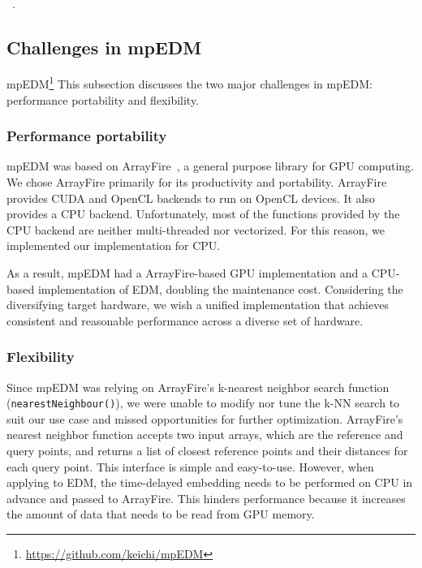 \documentclass[conference]{IEEEtran}
\begin{document}
~\cite{Natsukawa2017,VanBerkel2020}

~\cite{Pu2019,Ma2017}.

\subsection{Challenges in mpEDM}\label{sec:challenges}

mpEDM\footnote{\url{https://github.com/keichi/mpEDM}}
This subsection discusses the two major challenges in mpEDM: performance
portability and flexibility.

\subsubsection{Performance portability}

mpEDM was based on ArrayFire~\cite{Malcolm2012}, a general purpose library for
GPU computing. We chose ArrayFire primarily for its productivity and
portability. ArrayFire provides CUDA and OpenCL backends to run on OpenCL
devices. It also provides a CPU backend. Unfortunately, most of the functions
provided by the CPU backend are neither multi-threaded nor vectorized. For this
reason, we implemented our implementation for CPU\@.

As a result, mpEDM had a ArrayFire-based GPU implementation and a CPU-based
implementation of EDM, doubling the maintenance cost. Considering the
diversifying target hardware, we wish a unified implementation that achieves
consistent and reasonable performance across a diverse set of hardware.

\subsubsection{Flexibility}

Since mpEDM was relying on ArrayFire's k-nearest neighbor search function
(\texttt{nearestNeighbour()}), we were unable to modify nor tune the k-NN
search to suit our use case and missed opportunities for further optimization.
ArrayFire's nearest neighbor function accepts two input arrays, which are the
reference and query points, and returns a list of closest reference points and
their distances for each query point. This interface is simple and
easy-to-use. However, when applying to EDM, the time-delayed embedding needs
to be performed on CPU in advance and passed to ArrayFire. This hinders
performance because it increases the amount of data that needs to be read from
GPU memory.
\end{document}
